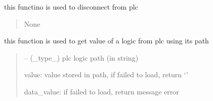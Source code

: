 \documentclass[letterpaper,10pt,english]{sphinxmanual}
\begin{document}
\begin{savenotes}
\begin{fulllineitems}

\begin{savenotes}\begin{fulllineitems}
\label{\detokenize{setting/backend/plc_managment:oxin.backend.plc_managment.management.disconnect}}
\pysigstartsignatures
{}
\pysigstopsignatures
\sphinxAtStartPar
this functino is used to disconnect from plc
\begin{quote}\begin{description}
\sphinxAtStartPar
None

\end{description}\end{quote}

\end{fulllineitems}\end{savenotes}


\begin{savenotes}\begin{fulllineitems}
\label{\detokenize{setting/backend/plc_managment:oxin.backend.plc_managment.management.get_value}}
\pysigstartsignatures
{}
\pysigstopsignatures
\sphinxAtStartPar
this function is used to get value of a logic from plc using its path
\begin{quote}\begin{description}
\sphinxAtStartPar
{} – (\_type\_) plc logic path (in string)

\sphinxAtStartPar
value: value stored in path, if failed to load, return ‘\sphinxhyphen{}’

\sphinxAtStartPar
data\_value: if failed to load, return message error

\end{description}\end{quote}

\end{fulllineitems}\end{savenotes}


\end{fulllineitems}
\end{savenotes}
\end{document}
